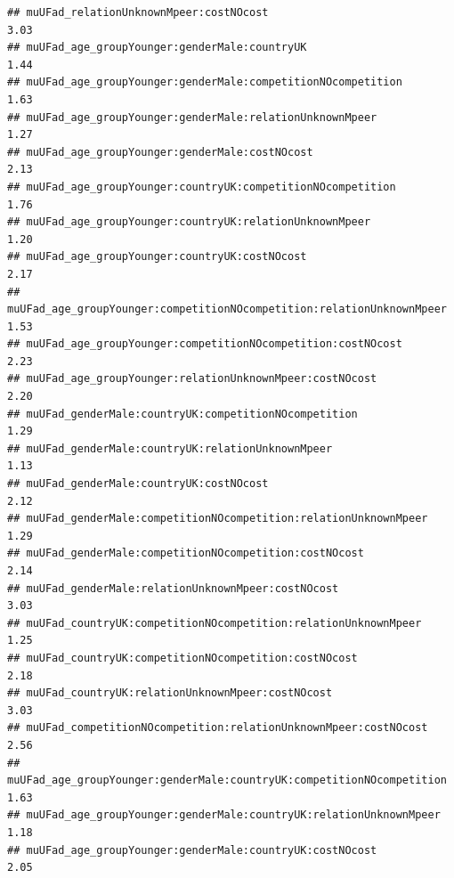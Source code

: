 \documentclass[
]{article}
\begin{document}
\begin{verbatim}
## muUFad_relationUnknownMpeer:costNOcost                                                                 3.03
## muUFad_age_groupYounger:genderMale:countryUK                                                           1.44
## muUFad_age_groupYounger:genderMale:competitionNOcompetition                                            1.63
## muUFad_age_groupYounger:genderMale:relationUnknownMpeer                                                1.27
## muUFad_age_groupYounger:genderMale:costNOcost                                                          2.13
## muUFad_age_groupYounger:countryUK:competitionNOcompetition                                             1.76
## muUFad_age_groupYounger:countryUK:relationUnknownMpeer                                                 1.20
## muUFad_age_groupYounger:countryUK:costNOcost                                                           2.17
## muUFad_age_groupYounger:competitionNOcompetition:relationUnknownMpeer                                  1.53
## muUFad_age_groupYounger:competitionNOcompetition:costNOcost                                            2.23
## muUFad_age_groupYounger:relationUnknownMpeer:costNOcost                                                2.20
## muUFad_genderMale:countryUK:competitionNOcompetition                                                   1.29
## muUFad_genderMale:countryUK:relationUnknownMpeer                                                       1.13
## muUFad_genderMale:countryUK:costNOcost                                                                 2.12
## muUFad_genderMale:competitionNOcompetition:relationUnknownMpeer                                        1.29
## muUFad_genderMale:competitionNOcompetition:costNOcost                                                  2.14
## muUFad_genderMale:relationUnknownMpeer:costNOcost                                                      3.03
## muUFad_countryUK:competitionNOcompetition:relationUnknownMpeer                                         1.25
## muUFad_countryUK:competitionNOcompetition:costNOcost                                                   2.18
## muUFad_countryUK:relationUnknownMpeer:costNOcost                                                       3.03
## muUFad_competitionNOcompetition:relationUnknownMpeer:costNOcost                                        2.56
## muUFad_age_groupYounger:genderMale:countryUK:competitionNOcompetition                                  1.63
## muUFad_age_groupYounger:genderMale:countryUK:relationUnknownMpeer                                      1.18
## muUFad_age_groupYounger:genderMale:countryUK:costNOcost                                                2.05

\end{verbatim}
\end{document}
